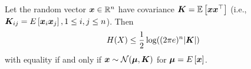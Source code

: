 \begin{theorem}
    Let the random vector ${\bm{x}} \in \mathbb{R}^n$ have covariance ${\bm{K}} = \mathbb{E}\left[{\bm{x}}{\bm{x}}^{\top}\right]$ (i.e., ${\bm{K}}_{ij} = E\left[{\bm{x}}_i {\bm{x}}_j\right] , 1 \leq i, j \leq n$). Then 
    \begin{equation*}
        H(X) \leq \frac{1}{2} \log((2\pi e)^n|{\bm{K}}|)
    \end{equation*}
with equality if and only if ${\bm{x}} \sim {\mathcal{N}}({\bm{\mu}}, {\bm{K}})$ for ${\bm{\mu}} = E\left[{\bm{x}}\right]$.
\label{thm:entropy_bound}
\end{theorem}
